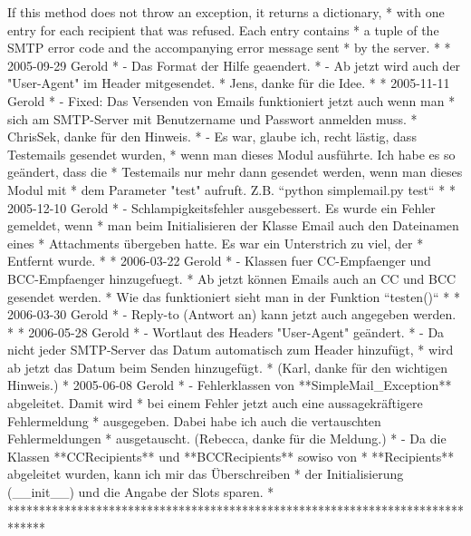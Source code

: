 If this method does not throw an exception, it returns a dictionary, *     
with one entry for each recipient that was refused. Each entry contains *
a tuple of the SMTP error code and the accompanying error message sent *
by the server. * * 2005-09-29 Gerold *   - Das Format der Hilfe geaendert. 
*   - Ab jetzt wird auch der "User-Agent" im Header mitgesendet. *     
Jens, danke für die Idee. * * 2005-11-11 Gerold *   - Fixed: Das Versenden 
von Emails funktioniert jetzt auch wenn man *     sich am SMTP-Server mit 
Benutzername und Passwort anmelden muss. *     ChrisSek, danke für den 
Hinweis. *   - Es war, glaube ich, recht lästig, dass Testemails gesendet 
wurden, *     wenn man dieses Modul ausführte. Ich habe es so geändert, 
dass die *     Testemails nur mehr dann gesendet werden, wenn man dieses 
Modul mit *     dem Parameter "test" aufruft. Z.B. ``python simplemail.py 
test`` * * 2005-12-10 Gerold *   - Schlampigkeitsfehler ausgebessert. Es 
wurde ein Fehler gemeldet, wenn *     man beim Initialisieren der Klasse 
Email auch den Dateinamen eines *     Attachments übergeben hatte. Es war 
ein Unterstrich zu viel, der *     Entfernt wurde. * * 2006-03-22 Gerold *
- Klassen fuer CC-Empfaenger und BCC-Empfaenger hinzugefuegt. *     Ab 
jetzt können Emails auch an CC und BCC gesendet werden. *     Wie das 
funktioniert sieht man in der Funktion ``testen()`` * * 2006-03-30 Gerold *
- Reply-to (Antwort an) kann jetzt auch angegeben werden. * * 2006-05-28 
Gerold *   - Wortlaut des Headers "User-Agent" geändert. *   - Da nicht 
jeder SMTP-Server das Datum automatisch zum Header hinzufügt, *     wird ab
jetzt das Datum beim Senden hinzugefügt. *     (Karl, danke für den 
wichtigen Hinweis.) * 2005-06-08 Gerold *   - Fehlerklassen von 
**SimpleMail\_Exception** abgeleitet. Damit wird *     bei einem Fehler 
jetzt auch eine aussagekräftigere Fehlermeldung *     ausgegeben. Dabei 
habe ich auch die vertauschten Fehlermeldungen *     ausgetauscht. 
(Rebecca, danke für die Meldung.) *   - Da die Klassen **CCRecipients** und
**BCCRecipients** sowiso von *     **Recipients** abgeleitet wurden, kann 
ich mir das Überschreiben *     der Initialisierung (\_\_init\_\_) und die 
Angabe der Slots sparen. * 
******************************************************************************




